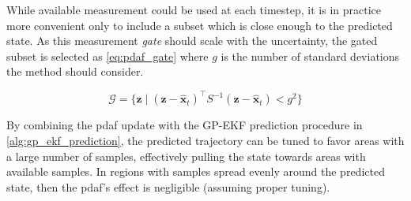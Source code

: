 While available measurement could be used at each timestep, it is in practice more convenient only to include a subset which is close enough to the predicted state. As this measurement \textit{gate} should scale with the uncertainty, the gated subset is selected as \cref{eq:pdaf_gate} where $g$ is the number of standard deviations the method should consider.

\begin{equation} \label{eq:pdaf_gate}
    \mathcal{G} = \big\{ \boldsymbol{z} \; | \; (\boldsymbol{z} - \hat{\boldsymbol{x}}_t)^\intercal S^{-1} (\boldsymbol{z} - \hat{\boldsymbol{x}}_t) < g^2 \big\}
\end{equation}


By combining the \acrshort{pdaf} update with the GP-EKF prediction procedure in \cref{alg:gp_ekf_prediction}, the predicted trajectory can be tuned to favor areas with a large number of samples, effectively pulling the state towards areas with available samples. In regions with samples spread evenly around the predicted state, then the \acrshort{pdaf}'s effect is negligible (assuming proper tuning).

